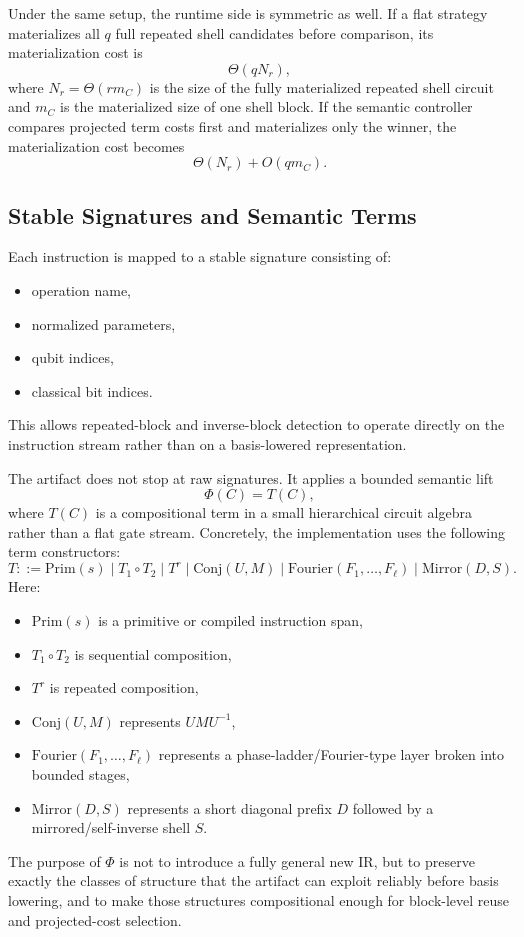 \documentclass[11pt]{article}
\begin{document}
Under the same setup, the runtime side is symmetric as well. If a flat
strategy materializes all $q$ full repeated shell candidates before
comparison, its materialization cost is
\[
\Theta(q N_r),
\]
where $N_r = \Theta(r m_C)$ is the size of the fully materialized repeated
shell circuit and $m_C$ is the materialized size of one shell block. If the
semantic controller compares projected term costs first and materializes only
the winner, the materialization cost becomes
\[
\Theta(N_r) + O(q m_C).
\]

\subsection{Stable Signatures and Semantic Terms}

Each instruction is mapped to a stable signature consisting of:
\begin{itemize}[leftmargin=1.5em]
    \item operation name,
    \item normalized parameters,
    \item qubit indices,
    \item classical bit indices.
\end{itemize}
This allows repeated-block and inverse-block detection to operate directly on the instruction stream rather than on a basis-lowered representation.

The artifact does not stop at raw signatures. It applies a bounded semantic lift
\[
\Phi(C) = T(C),
\]
where $T(C)$ is a compositional term in a small hierarchical circuit algebra rather than a flat gate stream. Concretely, the implementation uses the following term constructors:
\[
T ::= \mathrm{Prim}(s)
\mid T_1 \circ T_2
\mid T^r
\mid \mathrm{Conj}(U,M)
\mid \mathrm{Fourier}(F_1,\dots,F_\ell)
\mid \mathrm{Mirror}(D,S).
\]
Here:
\begin{itemize}[leftmargin=1.5em]
    \item $\mathrm{Prim}(s)$ is a primitive or compiled instruction span,
    \item $T_1 \circ T_2$ is sequential composition,
    \item $T^r$ is repeated composition,
    \item $\mathrm{Conj}(U,M)$ represents $U M U^{-1}$,
    \item $\mathrm{Fourier}(F_1,\dots,F_\ell)$ represents a phase-ladder/Fourier-type layer broken into bounded stages,
    \item $\mathrm{Mirror}(D,S)$ represents a short diagonal prefix $D$ followed by a mirrored/self-inverse shell $S$.
\end{itemize}
The purpose of $\Phi$ is not to introduce a fully general new IR, but to preserve exactly the classes of structure that the artifact can exploit reliably before basis lowering, and to make those structures compositional enough for block-level reuse and projected-cost selection.
\end{document}
